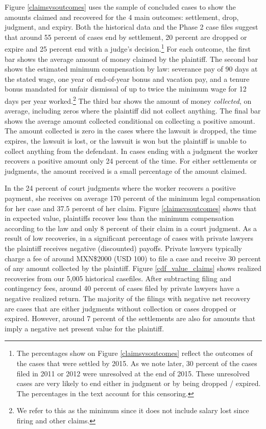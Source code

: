 \documentclass[11pt, a4paper]{article}
\begin{document}
Figure \ref{claimsvsoutcomes} uses the sample of concluded cases to show the amounts claimed and recovered for the 4 main outcomes: settlement, drop, judgment, and expiry. Both the historical data and the Phase 2 case files suggest that around 55 percent of cases end by settlement, 20 percent are dropped or expire and 25 percent end with a judge's decision.\footnote{The percentages show on Figure \ref{claimsvsoutcomes} reflect the outcomes of the cases that were settled by 2015. As we note later, 30 percent of the cases filed in 2011 or 2012 were unresolved at the end of 2015. These unresolved cases are very likely to end either in judgment or by being dropped / expired. The percentages in the text account for this censoring.} For each outcome, the first bar shows the average amount of money claimed by the plaintiff. The second bar shows the estimated minimum compensation by law: severance pay of 90 days at the stated wage, one year of end-of-year bonus and vacation pay, and a tenure bonus mandated for unfair dismissal of up to twice the minimum wage for 12 days per year worked.\footnote{We refer to this as the minimum since it does not include salary lost since firing and other claims.} The third bar shows the amount of money \textit{collected}, on average, including zeros where the plaintiff did not collect anything. The final bar shows the average amount collected conditional on collecting a positive amount. The amount collected is zero in the cases where the lawsuit is dropped, the time expires, the lawsuit is lost, or the lawsuit is won but the plaintiff is unable to collect anything from the defendant. In cases ending with a judgment the worker recovers a positive amount only 24 percent of the time. For either settlements or judgments, the amount received is a small percentage of the amount claimed.  

In the 24 percent of court judgments where the worker recovers a positive payment, she receives on average 170 percent of the minimum legal compensation for her case and 37.5 percent of her claim. Figure \ref{claimsvsoutcomes} shows that in expected value, plaintiffs recover less than the minimum compensation according to the law and only 8 percent of their claim in a court judgment. As a result of low recoveries, in a significant percentage of cases with private lawyers the plaintiff receives negative (discounted) payoffs. Private lawyers typically charge a fee of around MXN\$2000 (USD 100) to file a case and receive 30 percent of any amount collected by the plaintiff. Figure \ref{cdf_value_claims} shows realized recoveries from our 5,005 historical casefiles.  After subtracting filing and contingency fees, around 40 percent of cases filed by private lawyers have a negative realized return. The majority of the filings with negative net recovery are cases that are either judgments without collection or cases dropped or expired. However, around 7 percent of the settlements are also for amounts that imply a negative net present value for the plaintiff. 
\end{document}
